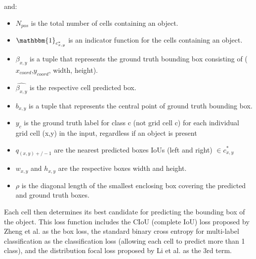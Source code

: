 \documentclass[10pt,twocolumn,letterpaper]{article}
\begin{document}
    
and:
\begin{itemize}[noitemsep]
\item $N_{pos}$ is the total number of cells containing an object.
\item $\mathbbm{1}_{c^*_{x,y}}$ is an indicator function for the cells containing an object. 
\item $\beta_{x,y}$ is a tuple that represents the ground truth bounding box consisting of ($x_{coord}$,$y_{coord}$, width, height).
\item $\hat{\beta_{x,y}}$ is the respective cell predicted box.
\item $b_{x,y}$ is a tuple that represents the central point of ground truth bounding box.
\item $y_c$ is the ground truth label for class c (not grid cell c) for each individual grid cell (x,y) in the input, regardless if an object is present
\item $q_{(x,y)+/- 1}$ are the nearest predicted boxes IoUs (left and right) $\in c^*_{x,y}$
\item $w_{x,y}$ and $h_{x,y}$ are the respective boxes width and height.
\item $\rho$ is the diagonal length of the smallest enclosing box covering the predicted and ground truth boxes.
\end{itemize}

Each cell then determines its best candidate for predicting the bounding box of the object. This loss function includes the CIoU (complete IoU) loss proposed by Zheng et al.\cite{CIoU} as the box loss, the standard binary cross entropy for multi-label classification as the classification loss (allowing each cell to predict more than 1 class), and the distribution focal loss proposed by Li et al.\cite{GFL} as the 3rd term.
    
\end{document}
